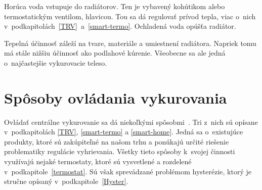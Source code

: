 Horúca voda vstupuje do radiátorov. 
Ten je vybavený kohútikom alebo termostatickým ventilom, hlavicou. 
Tou sa dá regulovať prívod tepla, viac o~nich v~podkapitolách~\ref{TRV}~a~\ref{smart-termo}. 
Ochladená voda opúšťa radiátor.

Tepelná účinnosť záleží na tvare, materiále a umiestnení radiátora. 
Napriek tomu má stále nižšiu účinnosť ako podlahové kúrenie. Všeobecne sa ale jedná o~najčastejšie vykurovacie teleso.


\section{Spôsoby ovládania vykurovania}\label{solutions}
Ovládať centrálne vykurovanie sa dá niekoľkými spôsobmi~\cite{hometree_2022}. Tri z~nich sú opísane v~podkapitolách \ref{TRV}, \ref{smart-termo} a \ref{smart-home}.
Jedná sa o~existujúce produkty, ktoré sú zakúpiteľné na našom trhu a ponúkajú určité riešenie problematiky regulácie vyhrievania. 
Všetky tieto spôsoby k~svojej činnosti využívajú nejaké termostaty, ktoré sú vysvetlené a rozdelené v~podkapitole~\ref{termostat}.
Sú však sprevádzané problémom hysterézie, ktorý je stručne opísaný v~podkapitole~\ref{Hyster}.

